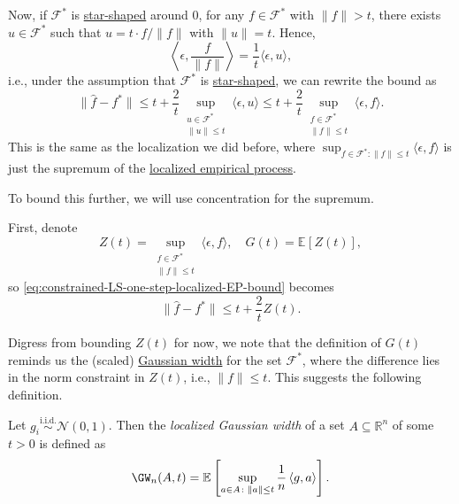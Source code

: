Now, if \(\mathscr{F} ^{\ast} \) is \hyperref[def:star-shaped]{star-shaped} around \(0\), for any \(f\in \mathscr{F} ^{\ast} \) with \(\lVert f \rVert > t\), there exists \(u \in \mathscr{F} ^{\ast} \) such that \(u = t \cdot f / \lVert f \rVert \) with \(\lVert u \rVert = t\). Hence,
\[
	\left\langle \epsilon , \frac{f}{\lVert f \rVert } \right\rangle
	= \frac{1}{t} \langle \epsilon , u \rangle ,
\]
i.e., under the assumption that \(\mathscr{F} ^{\ast} \) is \hyperref[def:star-shaped]{star-shaped}, we can rewrite the bound as
\begin{equation}\label{eq:constrained-LS-one-step-localized-EP-bound}
	\lVert \hat{f} - f^{\ast} \rVert
	\leq t + \frac{2}{t} \sup _{\substack{u\in \mathscr{F} ^{\ast} \\ \lVert u \rVert \leq t}} \langle \epsilon , u \rangle
	\leq t + \frac{2}{t} \sup _{\substack{f\in \mathscr{F} ^{\ast} \\ \lVert f \rVert \leq t}} \langle \epsilon , f \rangle.
\end{equation}
This is the same as the localization we did before, where \(\sup _{f\in \mathscr{F} ^{\ast} \colon \lVert f \rVert \leq t} \langle \epsilon , f \rangle \) is just the supremum of the \hyperref[def:localized-EP]{localized empirical process}.

\begin{intuition}
	To bound this further, we will use concentration for the supremum.
\end{intuition}

First, denote
\[
	Z(t) = \sup _{\substack{f\in \mathscr{F} ^{\ast} \\ \lVert f \rVert \leq t}} \langle \epsilon , f \rangle
	,\quad G(t) = \mathbb{E}_{}\left[Z(t) \right],
\]
so \autoref{eq:constrained-LS-one-step-localized-EP-bound} becomes
\begin{equation}\label{eq:constrained-LS-one-step-localized-EP-bound-reduced}
	\lVert \hat{f} - f^{\ast} \rVert \leq t + \frac{2}{t} Z(t).
\end{equation}

Digress from bounding \(Z(t)\) for now, we note that the definition of \(G(t)\) reminds us the (scaled) \hyperref[def:Gaussian-width]{Gaussian width} for the set \(\mathscr{F} ^{\ast} \), where the difference lies in the norm constraint in \(Z(t)\), i.e., \(\lVert f \rVert \leq t\). This suggests the following definition.

\begin{definition}\label{def:localized-Gaussian-width}
	Let \(g_i \overset{\text{i.i.d.} }{\sim } \mathcal{N} (0, 1)\). Then the \emph{localized Gaussian width} of a set \(A \subseteq \mathbb{R} ^n\) of some \(t > 0\) is defined as
	\[
		\GW_n (A, t)
		= \mathbb{E}_{}\left[\sup _{a \in A \colon \lVert a \rVert \leq t} \frac{1}{n} \left\langle g , a \right\rangle \right].
	\]
\end{definition}

